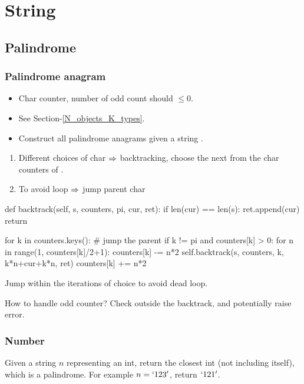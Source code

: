 \chapter{String}

\section{Palindrome}
\subsection{Palindrome anagram}
\begin{itemize}
\item {} Char counter, number of odd count should $\leq 0$.
\item {} See Section-\ref{N_objects_K_types}.
\item {} Construct all palindrome anagrams given a string .
\end{itemize}

\begin{enumerate}
\item Different choices of char $\Rightarrow$ backtracking, choose the next from the char counters of . 
\item To avoid loop $\Rightarrow$ jump parent char
\end{enumerate}

\begin{python}
def backtrack(self, s, counters, pi, cur, ret):
  if len(cur) == len(s):
    ret.append(cur)
    return

  for k in counters.keys():
    # jump the parent
    if k != pi and counters[k] > 0:
      for n in range(1, counters[k]/2+1):
        counters[k] -= n*2
        self.backtrack(s, counters, k, k*n+cur+k*n, ret)
        counters[k] += n*2
\end{python}

Jump within the iterations of choice to avoid dead loop. 

How to handle odd counter? Check outside the backtrack, and potentially raise error. 

\subsection{Number}
 Given a string $n$ representing an int, return the closest int (not including itself), which is a palindrome. For example $n = `123'$, return $`121'$. 


